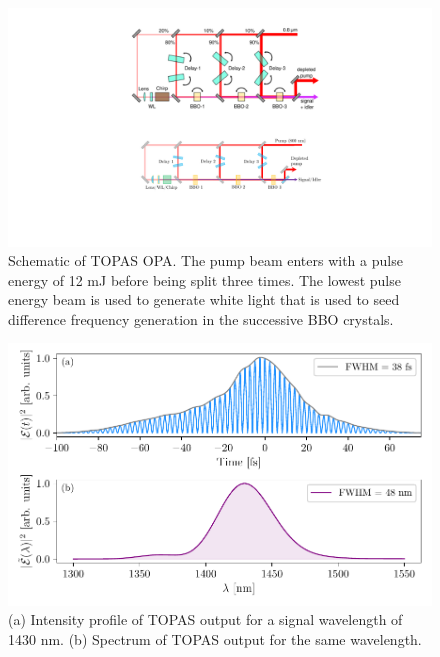 \begin{figure}
	\centering
	\includegraphics[width=1.0\textwidth]{figures/Beamline/OPA.pdf}
	\caption[Schematic of TOPAS]{Schematic of TOPAS OPA.  The pump beam enters with a pulse energy of 12 mJ before being split three times.  The lowest pulse energy beam is used to generate white light that is used to seed difference frequency generation in the successive BBO crystals.}
	\label{fig:OPA}
\end{figure}
\begin{figure}
	\centering
	\includegraphics[width=1.0\textwidth]{figures/Beamline/TOPAS_FROG.pdf}
	\caption[Intensity and spectrum of TOPAS output for 1430 nm]{(a) Intensity profile of TOPAS output for a signal wavelength of 1430 nm. (b) Spectrum of TOPAS output for the same wavelength.}
	\label{fig:TOPAS_FROG}
\end{figure}

